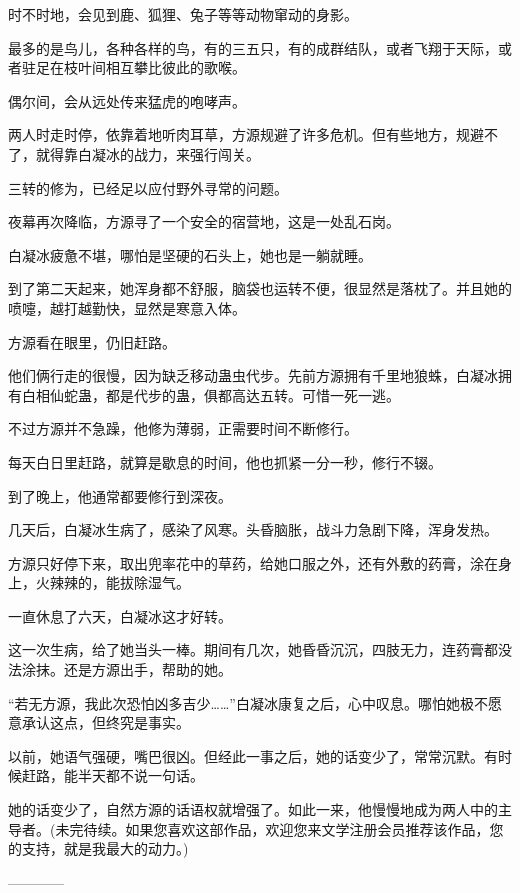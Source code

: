 \begin{this_body}
时不时地，会见到鹿、狐狸、兔子等等动物窜动的身影。

最多的是鸟儿，各种各样的鸟，有的三五只，有的成群结队，或者飞翔于天际，或者驻足在枝叶间相互攀比彼此的歌喉。

偶尔间，会从远处传来猛虎的咆哮声。

两人时走时停，依靠着地听肉耳草，方源规避了许多危机。但有些地方，规避不了，就得靠白凝冰的战力，来强行闯关。

三转的修为，已经足以应付野外寻常的问题。

夜幕再次降临，方源寻了一个安全的宿营地，这是一处乱石岗。

白凝冰疲惫不堪，哪怕是坚硬的石头上，她也是一躺就睡。

到了第二天起来，她浑身都不舒服，脑袋也运转不便，很显然是落枕了。并且她的喷嚏，越打越勤快，显然是寒意入体。

方源看在眼里，仍旧赶路。

他们俩行走的很慢，因为缺乏移动蛊虫代步。先前方源拥有千里地狼蛛，白凝冰拥有白相仙蛇蛊，都是代步的蛊，俱都高达五转。可惜一死一逃。

不过方源并不急躁，他修为薄弱，正需要时间不断修行。

每天白日里赶路，就算是歇息的时间，他也抓紧一分一秒，修行不辍。

到了晚上，他通常都要修行到深夜。

几天后，白凝冰生病了，感染了风寒。头昏脑胀，战斗力急剧下降，浑身发热。

方源只好停下来，取出兜率花中的草药，给她口服之外，还有外敷的药膏，涂在身上，火辣辣的，能拔除湿气。

一直休息了六天，白凝冰这才好转。

这一次生病，给了她当头一棒。期间有几次，她昏昏沉沉，四肢无力，连药膏都没法涂抹。还是方源出手，帮助的她。

“若无方源，我此次恐怕凶多吉少……”白凝冰康复之后，心中叹息。哪怕她极不愿意承认这点，但终究是事实。

以前，她语气强硬，嘴巴很凶。但经此一事之后，她的话变少了，常常沉默。有时候赶路，能半天都不说一句话。

她的话变少了，自然方源的话语权就增强了。如此一来，他慢慢地成为两人中的主导者。(未完待续。如果您喜欢这部作品，欢迎您来文学注册会员推荐该作品，您的支持，就是我最大的动力。)

------------

\end{this_body}

